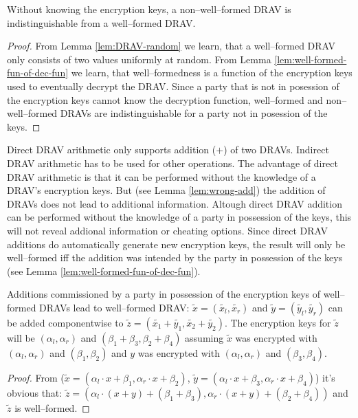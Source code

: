 \begin{lem}
  \label{lem:DRAV-indistinguishable}

  Without knowing the encryption keys, a non--well--formed DRAV is
  indistinguishable from a well--formed DRAV.

\end{lem}
\begin{proof}

  From Lemma \ref{lem:DRAV-random} we learn, that a well--formed DRAV only
  consists of two values uniformly at random. From Lemma
  \ref{lem:well-formed-fun-of-dec-fun} we learn, that well--formedness is a
  function of the encryption keys used to eventually decrypt the DRAV. Since a
  party that is not in posession of the encryption keys cannot know the
  decryption function, well--formed and non--well--formed DRAVs are
  indistinguishable for a party not in posession of the keys.
\end{proof}


\label{sec:direct-DRAV-arithmetic}

Direct DRAV arithmetic only supports addition ($+$) of two DRAVs. Indirect DRAV
arithmetic has to be used for other operations. The advantage of direct DRAV
arithmetic is that it can be performed without the knowledge of a DRAV's
encryption keys. But (see Lemma \ref{lem:wrong-add}) the addition of DRAVs does
not lead to additional information. Altough direct DRAV addition can be
performed without the knowledge of a party in possession of the keys, this will
not reveal addional information or cheating options. Since direct DRAV
additions do automatically generate new encryption keys, the result will only be
well--formed iff the addition was intended by the party in possession of the
keys (see Lemma \ref{lem:well-formed-fun-of-dec-fun}).

\begin{lem}
  \label{lem:DRAV-add}

Additions commissioned by a party in possession of the encryption keys of
well--formed DRAVs lead to well--formed DRAV: $\widetilde{x} =
(\widetilde{x_l}, \widetilde{x_r})$ and $\widetilde{y} = (\widetilde{y_l},
\widetilde{y_r})$ can be added componentwise to $\widetilde{z} =
\left(\widetilde{x_1} + \widetilde{y_1}, \widetilde{x_2} +
\widetilde{y_2}\right)$. The encryption keys for $\widetilde{z}$ will be
$(\alpha_l, \alpha_r)$ and $(\beta_1 + \beta_3, \beta_2 + \beta_4)$ assuming
$\widetilde{x}$ was encrypted with $(\alpha_l, \alpha_r)$ and $(\beta_1,
\beta_2)$ and $y$ was encrypted with $(\alpha_l, \alpha_r)$ and $(\beta_3,
\beta_4)$.

\end{lem}
\begin{proof}

From ($\widetilde{x} = \left(\alpha_l \cdot x + \beta_1,
\alpha_r \cdot x + \beta_2\right)$, $\widetilde{y} = \left(\alpha_l \cdot x +
\beta_3, \alpha_r \cdot x + \beta_4\right)$) it's obvious that: $\widetilde{z} =
\left(\alpha_l \cdot (x+y) + (\beta_1 + \beta_3), \alpha_r \cdot (x+y) +
(\beta_2 + \beta_4)\right)$ and $\widetilde{z}$ is well--formed.

\end{proof}


